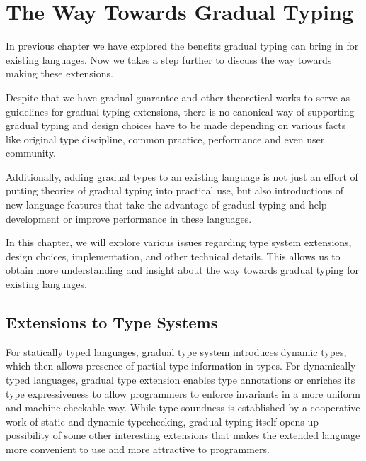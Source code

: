 
\section{The Way Towards Gradual Typing}


In previous chapter we have explored the benefits gradual typing
can bring in for existing languages.
Now we takes a step further to discuss the way towards making these extensions.

Despite that we have gradual guarantee\cite{siek2015refined} and other
theoretical works to serve as guidelines for gradual typing extensions,
there is no canonical way of supporting gradual typing
and design choices have to be made
depending on various facts like original type discipline, common practice, performance and even user community.

Additionally, adding gradual types to an existing language
is not just an effort of putting theories of gradual typing into practical use,
but also introductions of new language features
that take the advantage of gradual typing
and help development or improve performance in these languages.

In this chapter, we will explore various issues regarding
type system extensions, design choices,
implementation, and other technical details.
This allows us to obtain more understanding and insight about the way towards gradual typing for existing languages.

\subsection{Extensions to Type Systems}

For statically typed languages, gradual type system introduces
dynamic types, which then allows presence of partial type information
in types.
For dynamically typed languages, gradual type extension
enables type annotations or enriches its type expressiveness
to allow programmers to enforce invariants in a more uniform and
machine-checkable way.
While type soundness is established by a cooperative work
of static and dynamic typechecking,
gradual typing itself opens up possibility of some other interesting extensions
that makes the extended language more convenient to use and more attractive to programmers.

